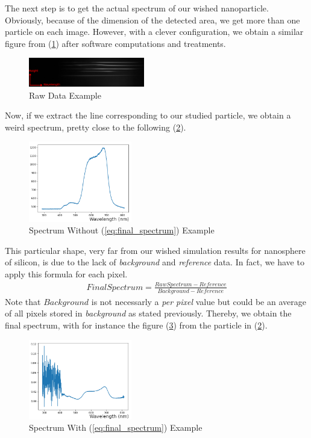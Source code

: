 \documentclass{article}
\numberwithin{equation}{section}
\begin{document}
The next step is to get the actual spectrum of our wished nanoparticle. Obviously, because of the dimension of the detected area, we get more than one particle on each image. However, with a clever configuration, we obtain a similar figure from (\ref{fig:raw_data_ex}) after software computations and treatments.
\begin{figure}[h]
    \centering
    \includegraphics[width=0.45\textwidth, height=0.15\textwidth]{raw_data_ex.png}
    \caption{Raw Data Example}
    \label{fig:raw_data_ex}
\end{figure}
Now, if we extract the line corresponding to our studied particle, we obtain a weird spectrum, pretty close to the following (\ref{fig:spectrum_wout_calc_ex}).
\begin{figure}[h]
    \centering
    \includegraphics[width=0.4\textwidth, height=0.35\textwidth]{spectrum_wout_calc_ex.png}
    \caption{Spectrum Without (\ref{eq:final_spectrum}) Example}
    \label{fig:spectrum_wout_calc_ex}
\end{figure}
This particular shape, very far from our wished simulation results for nanosphere of silicon, is due to the lack of \textit{background} and \textit{reference} data. In fact, we have to apply this formula for each pixel.
\begin{align}\label{eq:final_spectrum}
FinalSpectrum = \frac{RawSpectrum - Reference}{Background - Reference}
\end{align}
Note that $Background$ is not necessarly a \textit{per pixel} value but could be an average of all pixels stored in \textit{background} as stated previously. Thereby, we obtain the final spectrum, with for instance the figure (\ref{fig:spectrum_w_calc_ex}) from the particle in (\ref{fig:spectrum_wout_calc_ex}).
\begin{figure}[h]
    \centering
    \includegraphics[width=0.4\textwidth, height=0.35\textwidth]{spectrum_w_calc_ex.png}
    \caption{Spectrum With (\ref{eq:final_spectrum}) Example}
    \label{fig:spectrum_w_calc_ex}
\end{figure}
\end{document}

